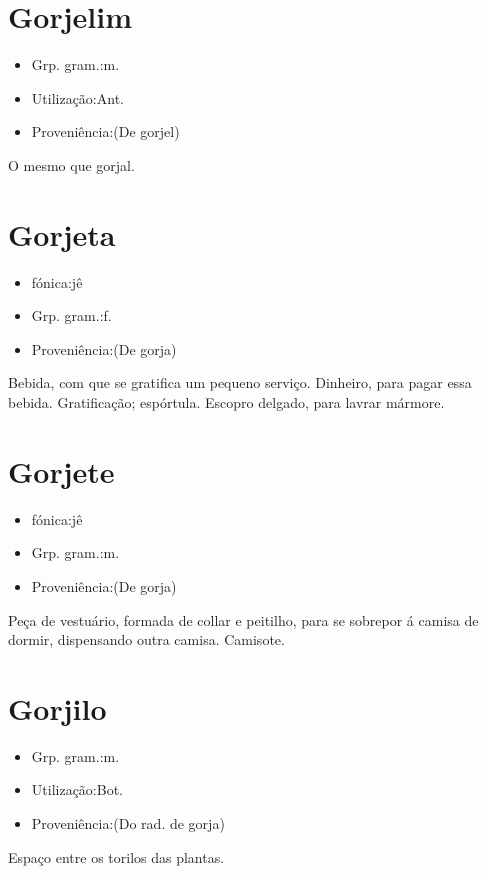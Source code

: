 \section{Gorjelim}
\begin{itemize}
\item {Grp. gram.:m.}
\end{itemize}
\begin{itemize}
\item {Utilização:Ant.}
\end{itemize}
\begin{itemize}
\item {Proveniência:(De \textunderscore gorjel\textunderscore )}
\end{itemize}
O mesmo que \textunderscore gorjal\textunderscore .
\section{Gorjeta}
\begin{itemize}
\item {fónica:jê}
\end{itemize}
\begin{itemize}
\item {Grp. gram.:f.}
\end{itemize}
\begin{itemize}
\item {Proveniência:(De \textunderscore gorja\textunderscore )}
\end{itemize}
Bebida, com que se gratifica um pequeno serviço.
Dinheiro, para pagar essa bebida.
Gratificação; espórtula.
Escopro delgado, para lavrar mármore.
\section{Gorjete}
\begin{itemize}
\item {fónica:jê}
\end{itemize}
\begin{itemize}
\item {Grp. gram.:m.}
\end{itemize}
\begin{itemize}
\item {Proveniência:(De \textunderscore gorja\textunderscore )}
\end{itemize}
Peça de vestuário, formada de collar e peitilho, para se sobrepor á camisa de dormir, dispensando outra camisa.
Camisote.
\section{Gorjilo}
\begin{itemize}
\item {Grp. gram.:m.}
\end{itemize}
\begin{itemize}
\item {Utilização:Bot.}
\end{itemize}
\begin{itemize}
\item {Proveniência:(Do rad. de \textunderscore gorja\textunderscore )}
\end{itemize}
Espaço entre os torilos das plantas.
